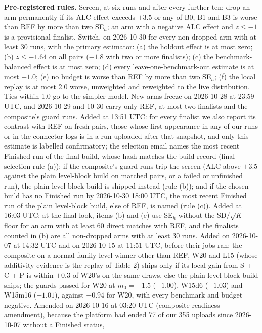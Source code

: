 \documentclass[
]{article}
\begin{document}
\textbf{Pre-registered rules.} Screen, at six runs and after every
further ten: drop an arm permanently if its ALC effect exceeds \(+3.5\)
or any of B0, B1 and B3 is worse than REF by more than two SE\(_h\); an
arm with a negative ALC effect and \(z \le -1\) is a provisional
finalist. Switch, on 2026-10-30 for every non-dropped arm with at least
30 runs, with the primary estimator: (a) the holdout effect is at most
zero; (b) \(z \le -1.64\) on all pairs (\(-1.8\) with two or more
finalists); (c) the benchmark-balanced effect is at most zero; (d) every
leave-one-benchmark-out estimate is at most \(+1.0\); (e) no budget is
worse than REF by more than two SE\(_h\); (f) the local replay is at
most 2.0 worse, unweighted and reweighted to the live distribution. Ties
within 1.0 go to the simpler model. New arms freeze on 2026-10-28 at
23:59 UTC, and 2026-10-29 and 10-30 carry only REF, at most two
finalists and the composite's guard runs. Added at 13:51 UTC: for every
finalist we also report its contrast with REF on fresh pairs, those
whose first appearance in any of our runs or in the connector logs is in
a run uploaded after that snapshot, and only this estimate is labelled
confirmatory; the selection email names the most recent Finished run of
the final build, whose hash matches the build record (final-selection
rule (a)); if the composite's guard runs trip the screen (ALC above
\(+3.5\) against the plain level-block build on matched pairs, or a
failed or unfinished run), the plain level-block build is shipped
instead (rule (b)); and if the chosen build has no Finished run by
2026-10-30 18:00 UTC, the most recent Finished run of the plain
level-block build, else of REF, is named (rule (c)). Added at 16:03 UTC:
at the final look, items (b) and (e) use SE\(_h\) without the
\(\mathrm{SD}/\sqrt{K}\) floor for an arm with at least 60 direct
matches with REF, and the finalists counted in (b) are all non-dropped
arms with at least 30 runs. Added on 2026-10-07 at 14:32 UTC and on
2026-10-15 at 11:51 UTC, before their jobs ran: the composite on a
normal-family level winner other than REF, W20 and L15 (whose additivity
evidence is the replay of Table 2) ships only if its local gain from S +
C + P is within \(\pm 0.3\) of W20's on the same draws, else the plain
level-block build ships; the guards passed for W20 at \(m_0 = -1.5\)
(\(-1.00\)), W15d6 (\(-1.03\)) and W15m16 (\(-1.01\)), against \(-0.94\)
for W20, with every benchmark and budget negative. Amended on 2026-10-16
at 03:20 UTC (composite readiness amendment), because the platform had
ended 77 of our 355 uploads since 2026-10-07 without a Finished status,
\end{document}
